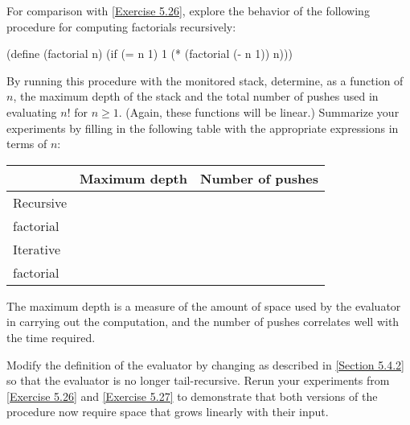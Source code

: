 \begin{exercise}
	\label{Exercise 5.27}
	For comparison with \cref{Exercise 5.26}, explore the behavior of the following procedure for computing factorials recursively:
	\begin{scheme}
	  (define (factorial n)
	    (if (= n 1) 1 (* (factorial (- n 1)) n)))
	\end{scheme}
	By running this procedure with the monitored stack, determine, as a function of \( n \), the maximum depth of the stack and the total number of pushes used in evaluating \( n! \) for \( n ≥ 1 \).
	(Again, these functions will be linear.)
	Summarize your experiments by filling in the following table with the appropriate expressions in terms of \( n \):
	\begin{center}
		\begin{tabular}{lll}
			{}        & Maximum depth & Number of pushes  \\
			\midrule
			Recursive & {}            & {}                \\
			factorial & {}            & {}                \\
			\midrule
			Iterative & {}            & {}                \\
			factorial & {}            & {}                \\
			\midrule
		\end{tabular}
	\end{center}
	The maximum depth is a measure of the amount of space used by the evaluator in carrying out the computation, and the number of pushes correlates well with the time required.
\end{exercise}

\begin{exercise}
	\label{Exercise 5.28}
	Modify the definition of the evaluator by changing  as described in \cref{Section 5.4.2} so that the evaluator is no longer tail-recursive.
	Rerun your experiments from \cref{Exercise 5.26} and \cref{Exercise 5.27} to demonstrate that both versions of the  procedure now require space that grows linearly with their input.
\end{exercise}

